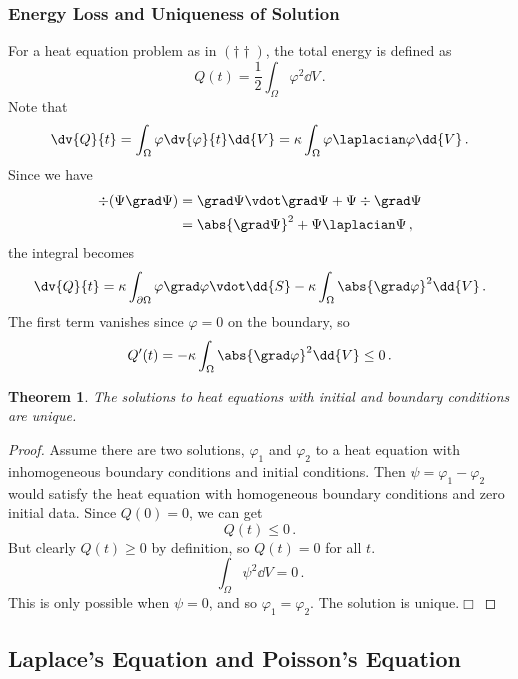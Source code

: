 \documentclass{article}
\theoremstyle{plain}\theoremheaderfont{\normalfont\itshape}\theorembodyfont{\rmfamily}\theoremseparator{.}\newtheorem*{rem}{Remark}\newtheorem*{ex}{Example}\newtheorem*{proof}{Proof}\newtheorem*{altp}{Alternative proof}
\theoremstyle{plain}\theoremheaderfont{\normalfont\bfseries}\theorembodyfont{\rmfamily}\theoremseparator{.}\newtheorem{thm}{Theorem}[section]\newtheorem{lem}[thm]{Lemma}\newtheorem{prop}[thm]{Proposition}\newtheorem*{cor}{Corollary}\newtheorem{defn}[thm]{Definition}\newtheorem{clm}[thm]{Claim}\newtheorem{clminproof}{Claim}
\theoremstyle{break}\theoremheaderfont{\normalfont\itshape}\theorembodyfont{\rmfamily}\theoremseparator{.\medskip}\newtheorem*{proofskip}{Proof}\newtheorem*{exs}{Examples}\newtheorem*{rems}{Remarks}
\theoremstyle{break}\theoremheaderfont{\normalfont\bfseries}\theorembodyfont{\rmfamily}\theoremseparator{.\medskip}\newtheorem{lemskip}[thm]{Lemma}\newtheorem{defnskip}[thm]{Definition}\newtheorem{propskip}[thm]{Proposition}\newtheorem{thmskip}[thm]{Theorem}
\numberwithin{equation}{section}
\newcommand{\qed}{\hfill\ensuremath{\Box}}
\begin{document}
	\subsubsection{Energy Loss and Uniqueness of Solution}
	For a heat equation problem as in \((\dagger\dagger)\), the total energy is defined as
	\[Q(t)=\frac{1}{2}\int_\Omega\varphi^2\dd{V}\,.\]
	Note that
	\[\dv{Q}{t}=\int_\Omega\varphi\dv{\varphi}{t}\dd{V}=\kappa\int_\Omega\varphi\laplacian\varphi\dd{V}\,.\]
	Since we have
	\begin{align*}
		\div(\Psi\grad\Psi)&=\grad\Psi\vdot\grad\Psi+\Psi\div\grad\Psi\\
		&=\abs{\grad\Psi}^2+\Psi\laplacian\Psi\,,
	\end{align*}
	the integral becomes
	\[\dv{Q}{t}=\kappa\int_{\partial\Omega}\varphi\grad\varphi\vdot\dd{S}-\kappa\int_\Omega\abs{\grad\varphi}^2\dd{V}\,.\]
	The first term vanishes since \(\varphi=0\) on the boundary, so
	\[Q'(t)=-\kappa\int_\Omega\abs{\grad\varphi}^2\dd{V}\le 0\,.\]
	\begin{thm}
		The solutions to heat equations with initial and boundary conditions are unique.
	\end{thm}
	\begin{proof}
		Assume there are two solutions, \(\varphi_1\) and \(\varphi_2\) to a heat equation with inhomogeneous boundary conditions and initial conditions. Then \(\psi=\varphi_1-\varphi_2\) would satisfy the heat equation with homogeneous boundary conditions and zero initial data. Since \(Q(0)=0\), we can get
		\[Q(t)\le 0\,.\]
		But clearly \(Q(t)\ge 0\) by definition, so \(Q(t)=0\) for all \(t\).
		\[\int_\Omega\psi^2\dd{V}=0\,.\]
		This is only possible when \(\psi=0\), and so \(\varphi_1=\varphi_2\). The solution is unique.\qed
	\end{proof}

	\subsection{Laplace's Equation and Poisson's Equation}
\end{document}
